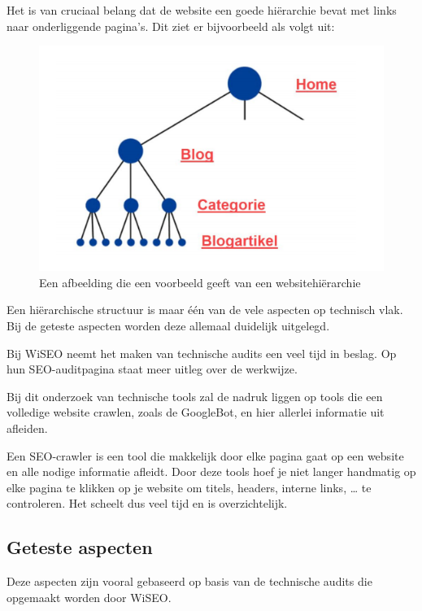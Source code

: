 Het is van cruciaal belang dat de website een goede hiërarchie bevat met links naar onderliggende pagina’s. Dit ziet er bijvoorbeeld als volgt uit: 

\begin{figure}[h!]
\centering
\includegraphics[width=\linewidth]{img/Websitestructuur.png}
\caption{Een afbeelding die een voorbeeld geeft van een websitehiërarchie}
\end{figure}

Een hiërarchische structuur is maar één van de vele aspecten op technisch vlak. Bij de geteste aspecten worden deze allemaal duidelijk uitgelegd.

Bij WiSEO neemt het maken van technische audits een veel tijd in beslag. Op hun SEO-auditpagina staat meer uitleg over de werkwijze. \textcite{AUDIT} 

Bij dit onderzoek van technische tools zal de nadruk liggen op tools die een volledige website crawlen, zoals de GoogleBot, en hier allerlei informatie uit afleiden.

Een SEO-crawler is een tool die makkelijk door elke pagina gaat op een website en alle nodige informatie afleidt. Door deze tools hoef je niet langer handmatig op elke pagina te klikken op je website om titels, headers, interne links, … te controleren. Het scheelt dus veel tijd en is overzichtelijk. 


\subsection{Geteste aspecten}
\label{ch: Geteste aspecten}

Deze aspecten zijn vooral gebaseerd op basis van de technische audits die opgemaakt worden door WiSEO.

